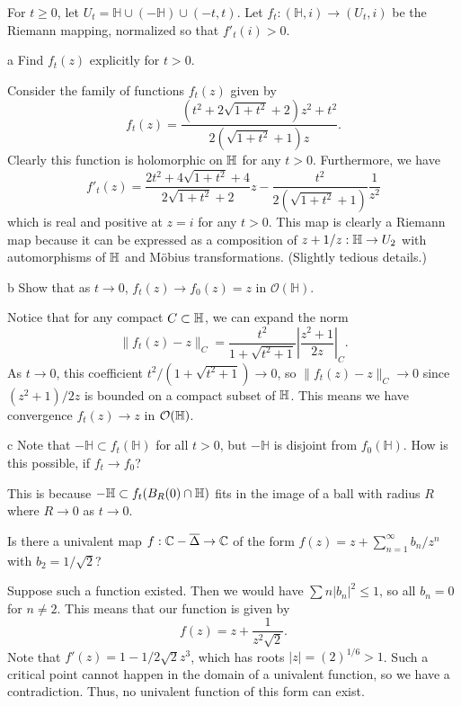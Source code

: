 \documentclass{pset}
\begin{document}
\begin{problem}{16}
  For $t\geq 0$, let $U_t = \mathbb{H}\cup (-\mathbb{H}) \cup (-t,t)$. Let $f_t : (\mathbb{H}, i) \to (U_t, i)$ be the Riemann mapping, normalized so that $f'_t(i)>0$.
\end{problem}

\begin{parts}
  \begin{part}{a}
    Find $f_t(z)$ explicitly for $t>0$.
  \end{part}

  Consider the family of functions $f_t(z)$ given by 
  \[
    f_t(z) = \frac{(t^2+2\sqrt{1+t^2}+2)z^2 + t^2}{2(\sqrt{1+t^2}+1) z}.
  \]
  Clearly this function is holomorphic on $\mathbb{H}$ for any $t>0$. Furthermore, we have
  \[
    f'_t(z) = \frac{2t^2+4\sqrt{1+t^2} + 4}{2\sqrt{1+t^2} + 2}z-\frac{t^2}{2(\sqrt{1+t^2}+1)}\frac{1}{z^2}
  \]
  which is real and positive at $z=i$ for any $t>0$. This map is clearly a Riemann map because it can be expressed as a composition of $z+1/z : \mathbb{H} \to U_2$ with automorphisms of $\mathbb{H}$ and M\"obius transformations. (Slightly tedious details.)

  \begin{part}{b}
    Show that as $t\to 0$, $f_t(z) \to f_0(z)=z$ in $\mathcal{O}(\mathbb{H})$.
  \end{part}

  Notice that for any compact $C\subset \mathbb{H}$, we can expand the norm
  \[
    \| f_t(z) - z\|_C = \frac{t^2}{1+\sqrt{t^2+1}}\left|\frac{z^2+1}{2z}\right|_C.
  \]
  As $t\to 0$, this coefficient $t^2/(1+\sqrt{t^2+1})\to 0$, so $\|f_t(z)-z\|_C \to 0$ since $(z^2+1)/2z$ is bounded on a compact subset of $\mathbb{H}$. This means we have convergence $f_t(z) \to z$ in $\mathcal{O}(\mathbb{H})$.

  \begin{part}{c}
    Note that $-\mathbb{H}\subset f_t(\mathbb{H})$ for all $t>0$, but $-\mathbb{H}$ is disjoint from $f_0(\mathbb{H})$. How is this possible, if $f_t \to f_0$?
  \end{part}

  This is because $-\mathbb{H} \subset f_t(B_R(0)\cap \mathbb{H})$ fits in the image of a ball with radius $R$ where $R\to 0$ as $t\to 0$.
\end{parts}

\begin{problem}{18}
  Is there a univalent map $f : \mathbb{C} - \overline{\Delta} \to \mathbb{C}$ of the form $f(z)=z+\sum^\infty_{n=1} b_n / z^n$ with $b_2 = 1/\sqrt{2}$?
\end{problem}

\begin{solution}
  Suppose such a function existed. Then we would have $\sum n |b_n|^2 \leq 1$, so all $b_n=0$ for $n\neq 2$. This means that our function is given by
  \[
    f(z) = z+ \frac{1}{z^2\sqrt{2}}.
  \]
  Note that $f'(z)=1-1/2\sqrt{2}z^3$, which has roots $|z|=(2)^{1/6} >1$. Such a critical point cannot happen in the domain of a univalent function, so we have a contradiction. Thus, no univalent function of this form can exist.
\end{solution}
\end{document}
